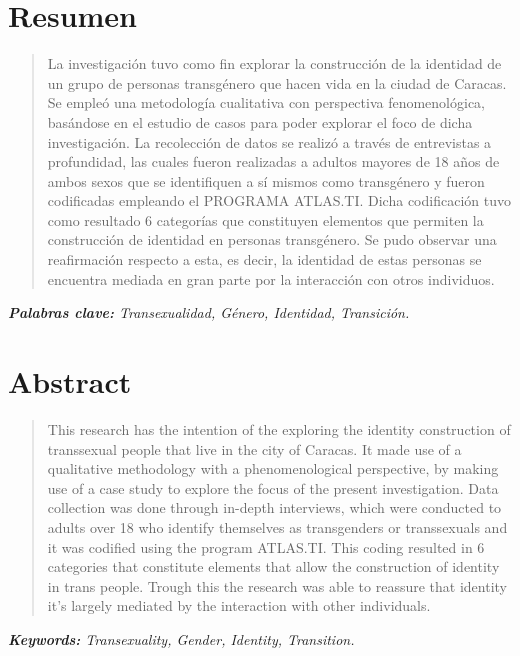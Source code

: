 
\chapter{Resumen}
\begin{center}
	\large \scshape \thetitle
\end{center}

\begin{quote}
La investigación tuvo como fin explorar la construcción de la identidad
de un grupo de personas transgénero que hacen vida en la ciudad de Caracas.
Se empleó una metodología cualitativa con perspectiva fenomenológica, basándose
en el estudio de casos para poder explorar el foco de dicha investigación.
La recolección de datos se realizó a través de entrevistas a profundidad, las
cuales fueron realizadas a adultos mayores de 18 años de ambos sexos que se
identifiquen a sí mismos como transgénero y fueron codificadas empleando el
PROGRAMA ATLAS.TI.
Dicha codificación tuvo como resultado 6 categorías que constituyen elementos
que permiten la construcción de identidad en personas transgénero.
Se pudo observar una reafirmación respecto a esta, es decir, la identidad de
estas personas se encuentra mediada en gran parte por la interacción con otros
individuos.
\end{quote}

\itshape \textbf{Palabras clave:} \normalfont Transexualidad, Género, Identidad,
Transición.

\chapter{Abstract}

\begin{center}
	\large \scshape \theengtitle
\end{center}

\begin{quote}
This research has the intention of the exploring the identity construction of
transsexual people that live in the city of Caracas.
It made use of a qualitative methodology with a phenomenological perspective, by
making use of a case study to explore the focus of the present investigation.
Data collection was done through in-depth interviews, which were conducted to
adults over 18 who identify themselves as transgenders or transsexuals and it
was codified using the program ATLAS.TI.
This coding resulted in 6 categories that constitute elements that allow the
construction of identity in trans people.
Trough this the research was able to reassure that identity it's largely
mediated by the interaction with other individuals.

\end{quote}

\itshape \textbf{Keywords:} \normalfont Transexuality, Gender, Identity,
Transition.

\cleardoublepage
